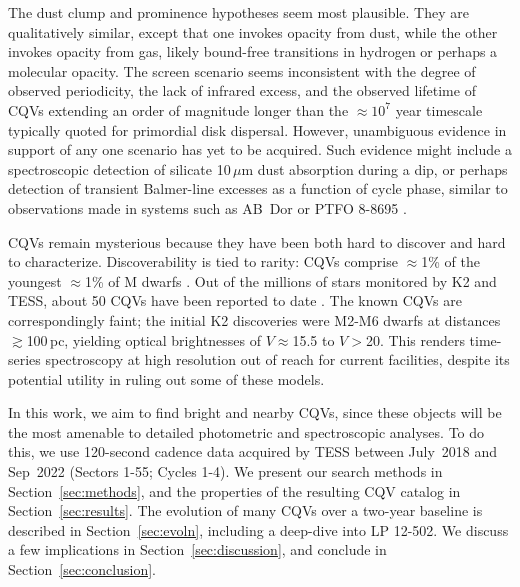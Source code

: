 \documentclass[11pt,twocolumn,tighten]{aastex63}
\begin{document}
The dust clump and prominence hypotheses seem most plausible.  They
are qualitatively similar, except that one invokes opacity from dust,
while the other invokes opacity from gas, likely bound-free
transitions in hydrogen or perhaps a molecular opacity.  The screen
scenario seems inconsistent with the degree of observed periodicity,
the lack of infrared excess, and the observed lifetime of CQVs
extending an order of magnitude longer than the $\approx$$10^7$ year
timescale typically quoted for primordial disk dispersal.  However,
unambiguous evidence in support of any one scenario has yet to be
acquired.  Such evidence might include a spectroscopic detection of
silicate 10\,$\mu$m dust absorption during a dip, or perhaps detection
of transient Balmer-line excesses as a function of cycle phase,
similar to observations made in systems such as AB~Dor
\citep[see][]{1999ASPC..158..146C} or PTFO 8-8695
\citep{2016ApJ...830...15J}.

CQVs remain mysterious because they have been both hard to discover
and hard to characterize.   Discoverability is tied to rarity: CQVs
comprise $\approx$1\% of the youngest $\approx$1\% of M dwarfs
\citep{2018AJ....155..196R}.  Out of the millions of stars monitored
by K2 and TESS, about 50 CQVs have been reported to date
\citep{2016AJ....152..114R,2017AJ....153..152S,2018AJ....155...63S,2019ApJ...876..127Z,2020AJ....160...86B,2022AJ....163..144G,2023ApJ...945..114P}.
The known CQVs are correspondingly faint; the initial K2 discoveries
\citep{2016AJ....152..114R,2017AJ....153..152S} were M2-M6 dwarfs at
distances $\gtrsim$100\,pc, yielding optical brightnesses of
$V$$\approx$15.5 to $V$$>$20.  This renders time-series spectroscopy
at high resolution out of reach for current facilities, despite its
potential utility in ruling out some of these models.

In this work, we aim to find bright and nearby CQVs, since these
objects will be the most amenable to detailed photometric and
spectroscopic analyses.  To do this, we use 120-second cadence data
acquired by TESS between July~2018 and Sep~2022 (Sectors 1-55; Cycles
1-4).  We present our search methods in Section~\ref{sec:methods}, and
the properties of the resulting CQV catalog in
Section~\ref{sec:results}.  The evolution of many CQVs over a two-year
baseline is described in Section~\ref{sec:evoln}, including a
deep-dive into LP 12-502.  We discuss a few implications in
Section~\ref{sec:discussion}, and conclude in
Section~\ref{sec:conclusion}.
\end{document}

